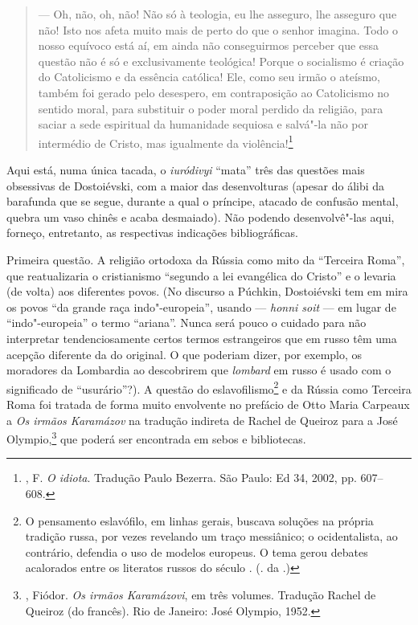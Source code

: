 \begin{quotation}
--- Oh, não, oh, não! Não só à teologia, eu lhe asseguro, lhe asseguro que não! Isto nos afeta muito mais de perto do que o senhor
imagina. Todo o nosso equívoco está aí, em ainda não conseguirmos perceber que essa questão não é só e exclusivamente teológica! Porque o socialismo é criação do Catolicismo e da essência católica! Ele, como seu irmão o ateísmo, também foi gerado pelo desespero, em contraposição ao Catolicismo no sentido moral, para substituir o poder moral perdido da religião, para saciar a sede espiritual da humanidade sequiosa e salvá"-la não por intermédio de Cristo, mas igualmente da violência!\footnote{, F. \emph{O idiota}. Tradução Paulo Bezerra. São Paulo: Ed 34, 2002, pp. 607--608.}
\end{quotation}

Aqui está, numa única tacada, o \emph{iuródivyi} ``mata'' três das questões mais obsessivas de Dostoiévski, com a maior das desenvolturas (apesar do álibi da barafunda que se segue, durante a qual o príncipe, atacado de confusão mental, quebra um vaso chinês e acaba desmaiado). Não podendo desenvolvê"-las aqui, forneço, entretanto, as respectivas indicações bibliográficas.

Primeira questão. A religião ortodoxa da Rússia como mito da
``Terceira Roma'', que reatualizaria o cristianismo ``segundo
a lei evangélica do Cristo'' e o levaria (de volta) aos
diferentes povos. (No discurso a Púchkin, Dostoiévski tem em
mira os povos ``da grande raça indo"-europeia'', usando ---
\emph{honni soit} --- em lugar de ``indo"-europeia'' o termo
``ariana''. Nunca será pouco o cuidado para não interpretar
tendenciosamente certos termos estrangeiros que em russo têm
uma acepção diferente da do original. O que poderiam dizer,
por exemplo, os moradores da Lombardia ao descobrirem que
\emph{lombard} em russo é usado com o significado de
``usurário''?). A questão do eslavofilismo\footnote{O
pensamento eslavófilo, em linhas gerais, buscava soluções
na própria tradição russa, por vezes revelando um traço
messiânico; o ocidentalista, ao contrário, defendia o uso
de modelos europeus. O tema gerou debates acalorados entre
os literatos russos do século . (. da .)} e
da Rússia como Terceira Roma foi tratada de forma muito
envolvente no prefácio de Otto Maria Carpeaux a \emph{Os
irmãos Karamázov} na tradução indireta de Rachel de Queiroz
para a José Olympio,\footnote{, Fiódor.
\emph{Os irmãos Karamázovi}, em três volumes. Tradução Rachel
de Queiroz (do francês). Rio de Janeiro: José Olympio, 1952.}
que poderá ser encontrada em sebos e bibliotecas.

